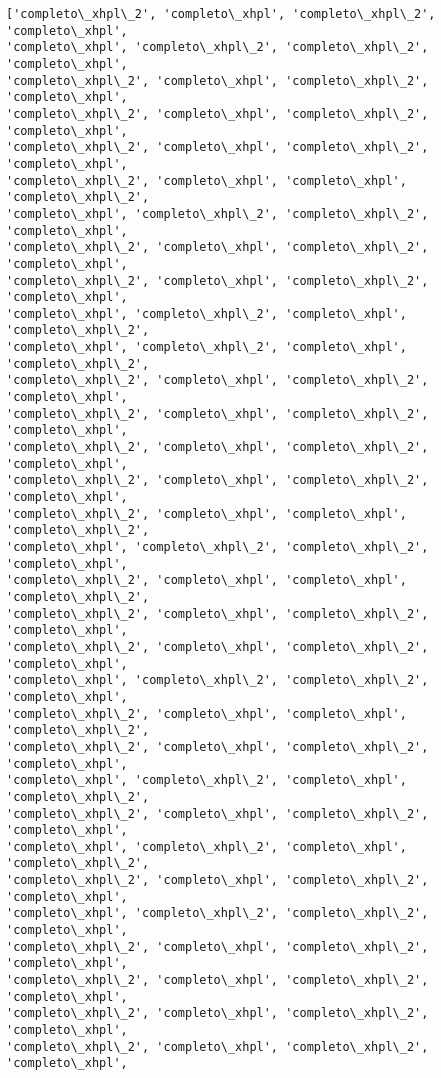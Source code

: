 \documentclass[11pt]{article}
\begin{document}
    \begin{Verbatim}[commandchars=\\\{\}]
['completo\_xhpl\_2', 'completo\_xhpl', 'completo\_xhpl\_2', 'completo\_xhpl',
'completo\_xhpl', 'completo\_xhpl\_2', 'completo\_xhpl\_2', 'completo\_xhpl',
'completo\_xhpl\_2', 'completo\_xhpl', 'completo\_xhpl\_2', 'completo\_xhpl',
'completo\_xhpl\_2', 'completo\_xhpl', 'completo\_xhpl\_2', 'completo\_xhpl',
'completo\_xhpl\_2', 'completo\_xhpl', 'completo\_xhpl\_2', 'completo\_xhpl',
'completo\_xhpl\_2', 'completo\_xhpl', 'completo\_xhpl', 'completo\_xhpl\_2',
'completo\_xhpl', 'completo\_xhpl\_2', 'completo\_xhpl\_2', 'completo\_xhpl',
'completo\_xhpl\_2', 'completo\_xhpl', 'completo\_xhpl\_2', 'completo\_xhpl',
'completo\_xhpl\_2', 'completo\_xhpl', 'completo\_xhpl\_2', 'completo\_xhpl',
'completo\_xhpl', 'completo\_xhpl\_2', 'completo\_xhpl', 'completo\_xhpl\_2',
'completo\_xhpl', 'completo\_xhpl\_2', 'completo\_xhpl', 'completo\_xhpl\_2',
'completo\_xhpl\_2', 'completo\_xhpl', 'completo\_xhpl\_2', 'completo\_xhpl',
'completo\_xhpl\_2', 'completo\_xhpl', 'completo\_xhpl\_2', 'completo\_xhpl',
'completo\_xhpl\_2', 'completo\_xhpl', 'completo\_xhpl\_2', 'completo\_xhpl',
'completo\_xhpl\_2', 'completo\_xhpl', 'completo\_xhpl\_2', 'completo\_xhpl',
'completo\_xhpl\_2', 'completo\_xhpl', 'completo\_xhpl', 'completo\_xhpl\_2',
'completo\_xhpl', 'completo\_xhpl\_2', 'completo\_xhpl\_2', 'completo\_xhpl',
'completo\_xhpl\_2', 'completo\_xhpl', 'completo\_xhpl', 'completo\_xhpl\_2',
'completo\_xhpl\_2', 'completo\_xhpl', 'completo\_xhpl\_2', 'completo\_xhpl',
'completo\_xhpl\_2', 'completo\_xhpl', 'completo\_xhpl\_2', 'completo\_xhpl',
'completo\_xhpl', 'completo\_xhpl\_2', 'completo\_xhpl\_2', 'completo\_xhpl',
'completo\_xhpl\_2', 'completo\_xhpl', 'completo\_xhpl', 'completo\_xhpl\_2',
'completo\_xhpl\_2', 'completo\_xhpl', 'completo\_xhpl\_2', 'completo\_xhpl',
'completo\_xhpl', 'completo\_xhpl\_2', 'completo\_xhpl', 'completo\_xhpl\_2',
'completo\_xhpl\_2', 'completo\_xhpl', 'completo\_xhpl\_2', 'completo\_xhpl',
'completo\_xhpl', 'completo\_xhpl\_2', 'completo\_xhpl', 'completo\_xhpl\_2',
'completo\_xhpl\_2', 'completo\_xhpl', 'completo\_xhpl\_2', 'completo\_xhpl',
'completo\_xhpl', 'completo\_xhpl\_2', 'completo\_xhpl\_2', 'completo\_xhpl',
'completo\_xhpl\_2', 'completo\_xhpl', 'completo\_xhpl\_2', 'completo\_xhpl',
'completo\_xhpl\_2', 'completo\_xhpl', 'completo\_xhpl\_2', 'completo\_xhpl',
'completo\_xhpl\_2', 'completo\_xhpl', 'completo\_xhpl\_2', 'completo\_xhpl',
'completo\_xhpl\_2', 'completo\_xhpl', 'completo\_xhpl\_2', 'completo\_xhpl',

\end{Verbatim}
\end{document}
